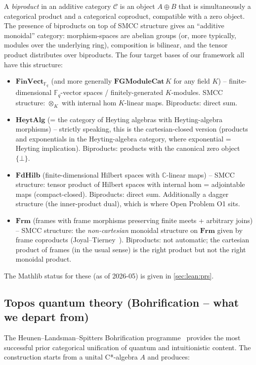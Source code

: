 \documentclass[11pt,a4paper]{article}
\theoremstyle{plain}
\theoremstyle{definition}
\theoremstyle{remark}
\newcommand{\F}{\mathbb{F}}
\newcommand{\C}{\mathbb{C}}
\newcommand{\cat}[1]{\mathbf{#1}}
\newcommand{\HeytAlg}{\cat{HeytAlg}}
\newcommand{\FdHilb}{\cat{FdHilb}}
\newcommand{\Frm}{\cat{Frm}}
\newcommand{\FinVect}{\cat{FinVect}}
\newcommand{\smcc}{SMCC}
\begin{document}
A \emph{biproduct} in an additive category $\mathcal{C}$ is an object $A \oplus B$ that is simultaneously a categorical product and a categorical coproduct, compatible with a zero object. The presence of biproducts on top of \smcc{} structure gives an ``additive monoidal'' category: morphism-spaces are abelian groups (or, more typically, modules over the underlying ring), composition is bilinear, and the tensor product distributes over biproducts. The four target bases of our framework all have this structure:

\begin{itemize}[leftmargin=*]
\item $\FinVect_{\F_q}$ (and more generally $\cat{FGModuleCat}\,K$ for any field $K$) -- finite-dimensional $\F_q$-vector spaces / finitely-generated $K$-modules. \smcc{} structure: $\otimes_K$ with internal hom $K$-linear maps. Biproducts: direct sum.
\item $\HeytAlg$ (= the category of Heyting algebras with Heyting-algebra morphisms) -- strictly speaking, this is the cartesian-closed version (products and exponentials in the Heyting-algebra category, where exponential = Heyting implication). Biproducts: products with the canonical zero object $\{\bot\}$.
\item $\FdHilb$ (finite-dimensional Hilbert spaces with $\C$-linear maps) -- \smcc{} structure: tensor product of Hilbert spaces with internal hom = adjointable maps (compact-closed). Biproducts: direct sum. Additionally a dagger structure (the inner-product dual), which is where Open Problem O1 sits.
\item $\Frm$ (frames with frame morphisms preserving finite meets + arbitrary joins) -- \smcc{} structure: the \emph{non-cartesian} monoidal structure on $\Frm$ given by frame coproducts (Joyal--Tierney~\cite{JT84}). Biproducts: not automatic; the cartesian product of frames (in the usual sense) is the right product but not the right monoidal product.
\end{itemize}

The Mathlib status for these (as of 2026-05) is given in \cref{sec:lean:prs}.

\subsection{Topos quantum theory (Bohrification -- what we depart from)}\label{sec:background:bohr}

The Heunen--Landsman--Spitters Bohrification programme~\cite{HLS09,HLSW12,DI08} provides the most successful prior categorical unification of quantum and intuitionistic content. The construction starts from a unital C*-algebra $A$ and produces:
\end{document}
